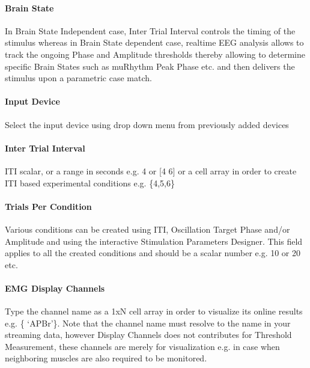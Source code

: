 \documentclass[letterpaper,10pt,english]{sphinxmanual}
\begin{document}
\paragraph{Brain State}
\label{\detokenize{13_TUSIntervention:brain-state}}
\sphinxAtStartPar
In Brain State Independent case, Inter Trial Interval controls the timing of the stimulus whereas in Brain State dependent case, real\sphinxhyphen{}time EEG analysis allows to track the ongoing Phase and Amplitude thresholds thereby allowing to determine specific Brain States such as mu\sphinxhyphen{}Rhythm Peak Phase etc. and then delivers the stimulus upon a parametric case match.


\paragraph{Input Device}
\label{\detokenize{13_TUSIntervention:input-device}}
\sphinxAtStartPar
Select the input device using drop down menu from previously added devices


\paragraph{Inter Trial Interval}
\label{\detokenize{13_TUSIntervention:inter-trial-interval}}
\sphinxAtStartPar
ITI scalar, or a range in seconds e.g. 4 or {[}4 6{]} or a cell array in order to create ITI based experimental conditions e.g. \{4,5,6\}


\paragraph{Trials Per Condition}
\label{\detokenize{13_TUSIntervention:trials-per-condition}}
\sphinxAtStartPar
Various conditions can be created using ITI, Oscillation Target Phase and/or Amplitude and using the interactive Stimulation Parameters Designer. This field applies to all the created conditions and should be a scalar number e.g. 10 or 20 etc.


\paragraph{EMG Display Channels}
\label{\detokenize{13_TUSIntervention:emg-display-channels}}
\sphinxAtStartPar
Type the channel name as a 1xN cell array in order to visualize its online results e.g. \{ ‘APBr’\}. Note that the channel name must resolve to the name in your streaming data, however Display Channels does not contributes for Threshold Measurement, these channels are merely for visualization e.g. in case when neighboring muscles are also required to be monitored.
\end{document}
